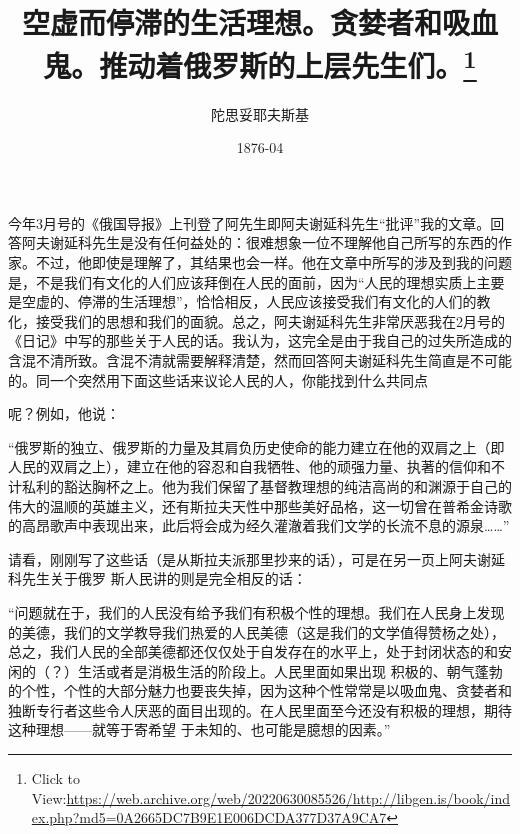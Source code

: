 \documentclass{article}
\title{空虚而停滞的生活理想。贪婪者和吸血鬼。推动着俄罗斯的上层先生们。\footnote{Click to View:\url{https://web.archive.org/web/20220630085526/http://libgen.is/book/index.php?md5=0A2665DC7B9E1E006DCDA377D37A9CA7}}}
\author{陀思妥耶夫斯基}
\date{1876-04}
\begin{document}

\maketitle


\Large

﻿今年3月号的《俄国导报》上刊登了阿先生即阿夫谢延科先生“批评”我的文章。回答阿夫谢延科先生是没有任何益处的：很难想象一位不理解他自己所写的东西的作家。不过，他即使是理解了，其结果也会一样。他在文章中所写的涉及到我的问题是，不是我们有文化的人们应该拜倒在人民的面前，因为“人民的理想实质上主要是空虚的、停滞的生活理想”，恰恰相反，人民应该接受我们有文化的人们的教化，接受我们的思想和我们的面貌。总之，阿夫谢延科先生非常厌恶我在2月号的《日记》中写的那些关于人民的话。我认为，这完全是由于我自己的过失所造成的含混不清所致。含混不清就需要解释清楚，然而回答阿夫谢延科先生简直是不可能的。同一个突然用下面这些话来议论人民的人，你能找到什么共同点

\newpage
呢？例如，他说： 

“俄罗斯的独立、俄罗斯的力量及其肩负历史使命的能力建立在他的双肩之上（即人民的双肩之上），建立在他的容忍和自我牺牲、他的顽强力量、执著的信仰和不计私利的豁达胸杯之上。他为我们保留了基督教理想的纯洁高尚的和渊源于自己的伟大的温顺的英雄主义，还有斯拉夫天性中那些美好品格，这一切曾在普希金诗歌的高昂歌声中表现出来，此后将会成为经久灌澈着我们文学的长流不息的源泉……”
 

请看，刚刚写了这些话（是从斯拉夫派那里抄来的话），可是在另一页上阿夫谢延科先生关于俄罗
斯人民讲的则是完全相反的话： 

“问题就在于，我们的人民没有给予我们有积极个性的理想。我们在人民身上发现的美德，我们的文学教导我们热爱的人民美德（这是我们的文学值得赞杨之处），总之，我们人民的全部美德都还仅仅处于自发存在的水平上，处于封闭状态的和安闲的（？）生活或者是消极生活的阶段上。人民里面如果出现
\newpage
积极的、朝气蓬勃的个性，个性的大部分魅力也要丧失掉，因为这种个性常常是以吸血鬼、贪婪者和独断专行者这些令人厌恶的面目出现的。在人民里面至今还没有积极的理想，期待这种理想——就等于寄希望
于未知的、也可能是臆想的因素。” 
\end{document}
